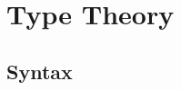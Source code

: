 \documentclass[acmsmall,screen,review]{acmart}
\newcommand{\ms}[1]{\ensuremath{\mathsf{#1}}}
\newcommand{\letexpr}[3]{\ensuremath{\ms{let}\;#1 = #2;\;#3}}
\newcommand{\teqv}{\approx}
\newcommand{\tref}{\twoheadrightarrow}
\begin{document}



\section{Type Theory}

\subsection{Syntax}
\end{document}
